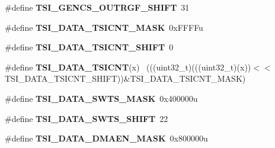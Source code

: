\begin{DoxyCompactItemize}
\item 
\hypertarget{group___t_s_i___register___masks_gaa269027bdefea51eddd47bfc47140224}{}\#define {\bfseries T\+S\+I\+\_\+\+G\+E\+N\+C\+S\+\_\+\+O\+U\+T\+R\+G\+F\+\_\+\+S\+H\+I\+F\+T}~31\label{group___t_s_i___register___masks_gaa269027bdefea51eddd47bfc47140224}

\item 
\hypertarget{group___t_s_i___register___masks_ga6b838baebe1044a43b0f64070cf708a8}{}\#define {\bfseries T\+S\+I\+\_\+\+D\+A\+T\+A\+\_\+\+T\+S\+I\+C\+N\+T\+\_\+\+M\+A\+S\+K}~0x\+F\+F\+F\+Fu\label{group___t_s_i___register___masks_ga6b838baebe1044a43b0f64070cf708a8}

\item 
\hypertarget{group___t_s_i___register___masks_ga364bea02a4d933c3fc935262493986cd}{}\#define {\bfseries T\+S\+I\+\_\+\+D\+A\+T\+A\+\_\+\+T\+S\+I\+C\+N\+T\+\_\+\+S\+H\+I\+F\+T}~0\label{group___t_s_i___register___masks_ga364bea02a4d933c3fc935262493986cd}

\item 
\hypertarget{group___t_s_i___register___masks_gac824bf56d28185bac9bbb5e70ac5966d}{}\#define {\bfseries T\+S\+I\+\_\+\+D\+A\+T\+A\+\_\+\+T\+S\+I\+C\+N\+T}(x)                                          ~(((uint32\+\_\+t)(((uint32\+\_\+t)(x))$<$$<$T\+S\+I\+\_\+\+D\+A\+T\+A\+\_\+\+T\+S\+I\+C\+N\+T\+\_\+\+S\+H\+I\+F\+T))\&T\+S\+I\+\_\+\+D\+A\+T\+A\+\_\+\+T\+S\+I\+C\+N\+T\+\_\+\+M\+A\+S\+K)\label{group___t_s_i___register___masks_gac824bf56d28185bac9bbb5e70ac5966d}

\item 
\hypertarget{group___t_s_i___register___masks_ga4b533f08277dec51d70c9bf4a536f9e5}{}\#define {\bfseries T\+S\+I\+\_\+\+D\+A\+T\+A\+\_\+\+S\+W\+T\+S\+\_\+\+M\+A\+S\+K}~0x400000u\label{group___t_s_i___register___masks_ga4b533f08277dec51d70c9bf4a536f9e5}

\item 
\hypertarget{group___t_s_i___register___masks_ga1e6460b9202aeb655c0a0f678b716526}{}\#define {\bfseries T\+S\+I\+\_\+\+D\+A\+T\+A\+\_\+\+S\+W\+T\+S\+\_\+\+S\+H\+I\+F\+T}~22\label{group___t_s_i___register___masks_ga1e6460b9202aeb655c0a0f678b716526}

\item 
\hypertarget{group___t_s_i___register___masks_gab6346bdfb0f86f39a0e22bf63724e2b6}{}\#define {\bfseries T\+S\+I\+\_\+\+D\+A\+T\+A\+\_\+\+D\+M\+A\+E\+N\+\_\+\+M\+A\+S\+K}~0x800000u\label{group___t_s_i___register___masks_gab6346bdfb0f86f39a0e22bf63724e2b6}


\end{DoxyCompactItemize}
